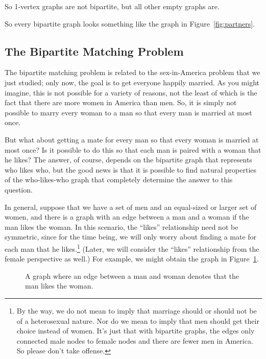 \begin{editingnotes}
So 1-vertex graphs are not bipartite, but all other empty graphs are.
\end{editingnotes}

So every bipartite graph looks something like the graph in
Figure~\ref{fig:partners}.

\subsection{The Bipartite Matching Problem}

The bipartite matching problem is related to the sex-in-America
problem that we just studied; only now, the goal is to get everyone
happily married.  As you might imagine, this is not possible for a
variety of reasons, not the least of which is the fact that there are
more women in America than men.  So, it is simply not possible to
marry every woman to a man so that every man is married at most once.

But what about getting a mate for every man so that every woman is married
at most once?  Is it possible to do this so that each man is paired with a
woman that he likes?  The answer, of course, depends on the bipartite graph
that represents who likes who, but the good news is that it is possible to
find natural properties of the who-likes-who graph that completely
determine the answer to this question.

In general, suppose that we have a set of men and an equal-sized or
larger set of women, and there is a graph with an edge between a man
and a woman if the man likes the woman.  In this scenario,
the ``likes'' relationship need not be symmetric, since for the time
being, we will only worry about finding a mate for each man that he
likes.\footnote{By the way, we do not mean to imply that marriage
  should or should not be of a heterosexual nature.  Nor do we mean to
  imply that men should get their choice instead of women.  It's just
  that with bipartite graphs, the edges only connected male nodes to
  female nodes and there are fewer men in America.  So please don't
  take offense.}  (Later, we will consider the ``likes'' relationship
from the female perspective as well.)  For example, we might obtain
the graph in Figure~\ref{fig:5J}.

\begin{figure}



\caption{A graph where an edge between a man and woman denotes that
  the man likes the woman.}

\label{fig:5J}

\end{figure}


